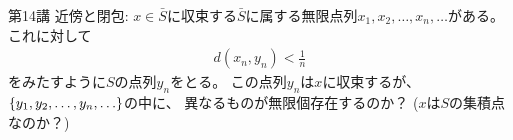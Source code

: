 \begin{problem}
    第14講 近傍と閉包: 
    $x \in \bar{S}$に収束する$\bar{S}$に属する無限点列$x_1, x_2, \ldots, x_n, \ldots$がある。
    これに対して
    \begin{align*}
        d(x_n, y_n) < \frac{1}{n}
    \end{align*}
    をみたすように$S$の点列$y_n$をとる。
    この点列$y_n$は$x$に収束するが、$\qty{y_1, y_2, \ldots, y_n, \ldots}$の中に、
    異なるものが無限個存在するのか？
    ($x$は$S$の集積点なのか？)
\end{problem}
